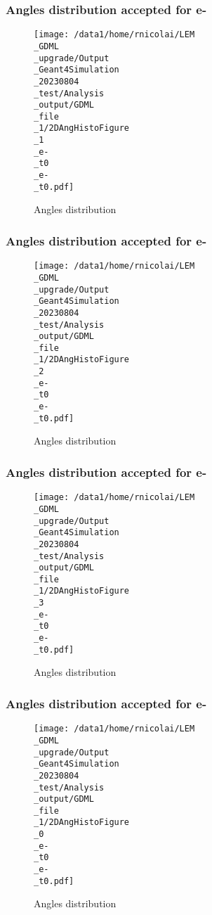 \documentclass[8pt]{beamer}
\begin{document}
            \begin{frame}
                \frametitle{Angles distribution accepted for e-}
            
        \begin{figure}[h]
            \centering
            \texttt{[image: /data1/home/rnicolai/LEM\\\_GDML\\\_upgrade/Output\\\_Geant4Simulation\\\_20230804\\\_test/Analysis\\\_output/GDML\\\_file\\\_1/2DAngHistoFigure\\\_1\\\_e-\\\_t0\\\_e-\\\_t0.pdf]}
            \caption{Angles distribution}
        \end{figure}
        
            \end{frame}
            
            \begin{frame}
                \frametitle{Angles distribution accepted for e-}
            
        \begin{figure}[h]
            \centering
            \texttt{[image: /data1/home/rnicolai/LEM\\\_GDML\\\_upgrade/Output\\\_Geant4Simulation\\\_20230804\\\_test/Analysis\\\_output/GDML\\\_file\\\_1/2DAngHistoFigure\\\_2\\\_e-\\\_t0\\\_e-\\\_t0.pdf]}
            \caption{Angles distribution}
        \end{figure}
        
            \end{frame}
            
            \begin{frame}
                \frametitle{Angles distribution accepted for e-}
            
        \begin{figure}[h]
            \centering
            \texttt{[image: /data1/home/rnicolai/LEM\\\_GDML\\\_upgrade/Output\\\_Geant4Simulation\\\_20230804\\\_test/Analysis\\\_output/GDML\\\_file\\\_1/2DAngHistoFigure\\\_3\\\_e-\\\_t0\\\_e-\\\_t0.pdf]}
            \caption{Angles distribution}
        \end{figure}
        
            \end{frame}
            
            \begin{frame}
                \frametitle{Angles distribution accepted for e-}
            
        \begin{figure}[h]
            \centering
            \texttt{[image: /data1/home/rnicolai/LEM\\\_GDML\\\_upgrade/Output\\\_Geant4Simulation\\\_20230804\\\_test/Analysis\\\_output/GDML\\\_file\\\_1/2DAngHistoFigure\\\_0\\\_e-\\\_t0\\\_e-\\\_t0.pdf]}
            \caption{Angles distribution}
        \end{figure}
        
            \end{frame}
            
\end{document}
